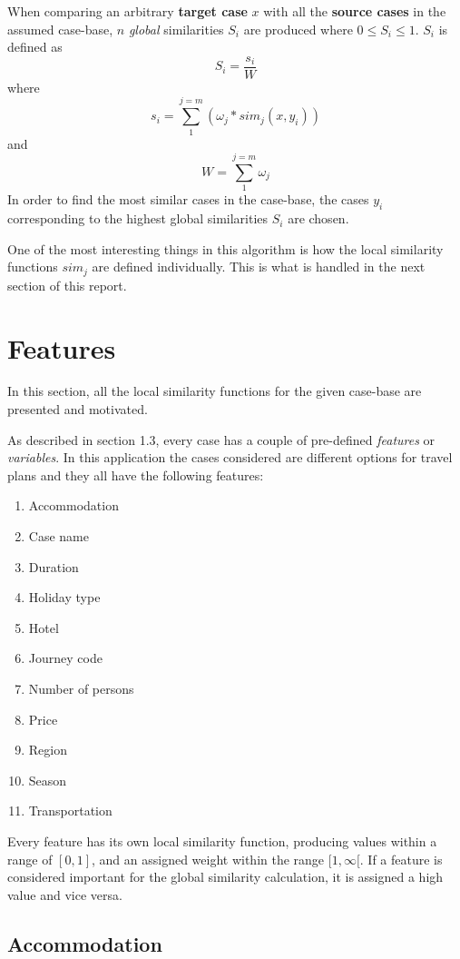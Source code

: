 \documentclass[12pt]{article}
\begin{document}
When comparing an arbitrary \textbf{target case} $x$ with all the \textbf{source cases} in the assumed case-base, $n$ \textit{global} similarities $S_i$ are produced where $0 \leq S_i \leq 1$. $S_i$ is defined as $$S_i=\frac{s_i}{W}$$ where $$s_i=\sum_{1}^{j=m} (\omega_j * sim_j(x,y_i))$$ and $$W=\sum_{1}^{j=m}\omega_j$$
In order to find the most similar cases in the case-base, the cases $y_i$ corresponding to the highest global similarities $S_i$ are chosen. 

One of the most interesting things in this algorithm is how the local similarity functions $sim_j$ are defined individually. This is what is handled in the next section of this report. 


\section{Features}

In this section, all the local similarity functions for the given case-base are presented and motivated. 

As described in section 1.3, every case has a couple of pre-defined \textit{features} or \textit{variables}. In this application the cases considered are different options for travel plans and they all have the following features:

\begin{enumerate}
\item Accommodation
\item Case name
\item Duration
\item Holiday type
\item Hotel
\item Journey code
\item Number of persons
\item Price
\item Region
\item Season
\item Transportation
\end{enumerate}

Every feature has its own local similarity function, producing values within a range of $[0,1]$, and an assigned weight within the range $[1,\infty[$. If a feature is considered important for the global similarity calculation, it is assigned a high value and vice versa. 

\subsection{Accommodation}
\end{document}
